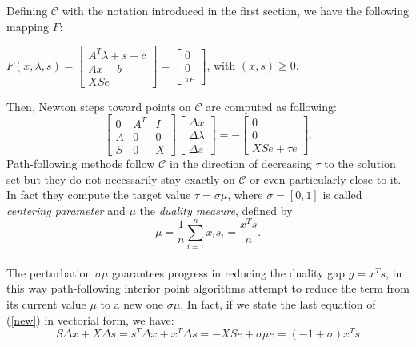 \documentclass[a4paper,10 pt,titlepage,twoside]{book}
\theoremstyle{plain}
\theoremstyle{definition}
\theoremstyle{remark}
\begin{document}
 
 Defining $\mathcal{C}$ with the notation introduced in the first section, we have the following mapping $\mathit{F}$:
 \begin{center}
 	$\mathit{F}(x,\lambda,s)= \begin{bmatrix}
 	A^{T}\lambda+s-c \\Ax-b \\XSe
 	\end{bmatrix}=\begin{bmatrix} 0\\0\\ \tau e \end{bmatrix}$, with $(x,s)\geq0$.
 \end{center}
Then, Newton steps toward points on $\mathcal{C}$ are computed as following:
 \begin{equation}\label{new}
 \begin{bmatrix}
 0&A^{T}&I \\A&0&0\\S&0&X
 \end{bmatrix}\begin{bmatrix}
 \Delta x\\\Delta\lambda \\\Delta s
 \end{bmatrix}=-\begin{bmatrix}
 0\\0\\XSe + \tau e
 \end{bmatrix}.
 \end{equation}
 Path-following methods follow $\mathcal{C}$ in the direction of decreasing $\tau$ to the solution set but they do not necessarily stay exactly on $\mathcal{C}$ or even particularly close to it. In fact they compute the target value $\tau = \sigma \mu$, where $\sigma = [0,1]$ is called \textit{centering parameter} and $\mu$ the \textit{duality measure}, defined by
 \begin{equation}\label{eq:dm}
 \mu = \frac{1}{n}\sum_{i=1}^{n} x_{i}s_{i} = \frac{x^{T}s}{n}.
 \end{equation}\\
 The perturbation $\sigma\mu$ guarantees progress in reducing the duality gap $g = x^{T}s$,
 in this way path-following interior point algorithms attempt to reduce the term from
 its current value $\mu$ to a new one $\sigma\mu$. In fact, if we state the last equation of (\ref{new}) in vectorial form, we have:
 \begin{equation}
 S\Delta x + X\Delta s = s^{T}\Delta x + x^{T}\Delta s = - XSe + \sigma \mu e = (-1 + \sigma)x^{T}s
 \end{equation}
\end{document}
